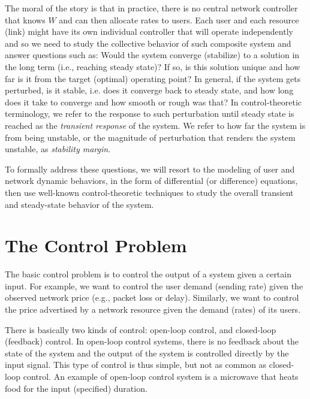 \documentclass{article}
\begin{document}
The moral of the story is that in practice,
there is no central network controller that knows $W$ and can then allocate rates to users.
Each user and each resource (link) might have its own individual controller that will operate
independently and so we need to study the collective behavior of such composite system
and answer questions such as:
Would the system converge (stabilize) to a solution in the long term (i.e., reaching steady state)?
If so, 
is this solution unique and how far is it from the target (optimal) operating point?
In general, if the system gets perturbed, is it stable, i.e.
does it converge back to steady state,
and how long does it take to converge and how smooth or rough was that?
In control-theoretic terminology,
we refer to the response to such perturbation until steady state is reached
as the {\em transient response} of the system.
We refer to how far the system is from being unstable,
or the magnitude of perturbation that renders the system unstable, as
{\em stability margin}.

To formally address these questions, we will resort to the modeling of user and network dynamic behaviors,
in the form of differential (or difference) equations, then use well-known control-theoretic techniques
to study the overall transient and steady-state behavior of the system.

\section{The Control Problem}
\label{sec:control}

The basic control problem is to control the output of a system given a certain input.
For example, we want to control the user demand (sending rate) given the observed network price (e.g., packet loss or delay).
Similarly, we want to control the price advertised by a network resource given the demand (rates) of its users.

There is basically two kinds of control: open-loop control, and closed-loop (feedback) control.
In open-loop control systems, there is no feedback about the state of the system and the output of the system is controlled directly by the input signal. This type of control is thus simple, but not as common as closed-loop control.
An example of open-loop control system is a microwave that heats food for the input (specified) duration.
\end{document}
